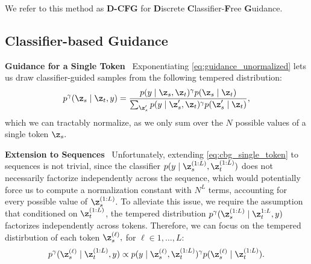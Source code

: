 \documentclass{article} %
\begin{document}
We refer to this method as \textbf{D-CFG} for \textbf{D}iscrete \textbf{C}lassifier-\textbf{F}ree \textbf{G}uidance.


\subsection{Classifier-based Guidance}\label{subsec:cbg}

\textbf{Guidance for a Single Token}~
Exponentiating \eqref{eq:guidance_unormalized} lets us draw classifier-guided samples from the following tempered distribution:
\begin{equation}\label{eq:cbg_single_token}
    p^\gamma(\z_s \mid \z_t, y) = \frac{p(y \mid \z_s, \z_t)^\gamma p(\z_s \mid \z_t)}{\sum_{\z_s'}p(y \mid \z_s', \z_t)^\gamma p(\z_s' \mid \z_t)},
\end{equation}
which we can tractably normalize, as we only sum over the $N$ possible values of a single token $\z_s.$

\textbf{Extension to Sequences}~
Unfortunately, extending \eqref{eq:cbg_single_token} to sequences is not trivial, since the classifier $p(y \mid \z_s^{(1:L)}, \z_t^{(1:L)})$ does not necessarily factorize independently across the sequence, which would potentially force us to compute a normalization constant with $N^{L}$ terms, accounting for every possible value of $\z_s^{(1:L)}.$
To alleviate this issue, we require the assumption that conditioned on $\z_t^{(1:L)}$, the tempered distribution $p^\gamma(\z_s^{(1:L)} \mid \z_t^{1:L}, y)$ factorizes independently across tokens.
Therefore, we can focus on the tempered distirbution of each token $\z_s^{(\ell)},$ for $\ell \in 1,\ldots, L$:
\begin{equation}\label{eq:cbg_sequences}
    p^\gamma(\z_s^{(\ell)} \mid \z_t^{(1:L)}, y) \propto p(y \mid \z_s^{(\ell)}, \z_t^{(1:L)})^\gamma p(\z_s^{(\ell)} \mid \z_t^{(1:L)}).
\end{equation}
\end{document}
